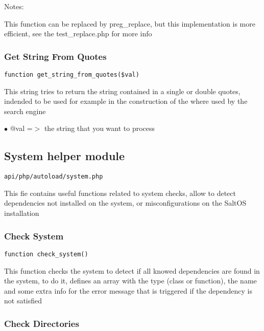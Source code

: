 \documentclass[a4paper]{article}
\begin{document}
Notes:

This function can be replaced by preg\_replace, but this implementation is
more efficient, see the test\_replace.php for more info

\hypertarget{toc254}{}
\subsubsection{Get String From Quotes}

\begin{lstlisting}
function get_string_from_quotes($val)
\end{lstlisting}

This string tries to return the string contained in a single or double
quotes, indended to be used for example in the construction of the where
used by the search engine

\begin{compactitem}
\item[\color{myblue}$\bullet$] @val =$>$ the string that you want to process
\end{compactitem}

\hypertarget{toc255}{}
\subsection{System helper module}

\begin{lstlisting}
api/php/autoload/system.php
\end{lstlisting}

This fie contains useful functions related to system checks, allow to detect dependencies not
installed on the system, or misconfigurations on the SaltOS installation

\hypertarget{toc256}{}
\subsubsection{Check System}

\begin{lstlisting}
function check_system()
\end{lstlisting}

This function checks the system to detect if all knowed dependencies are found in the system, to do it,
defines an array with the type (class or function), the name and some extra info for the error message
that is triggered if the dependency is not satisfied

\hypertarget{toc257}{}
\subsubsection{Check Directories}
\end{document}
